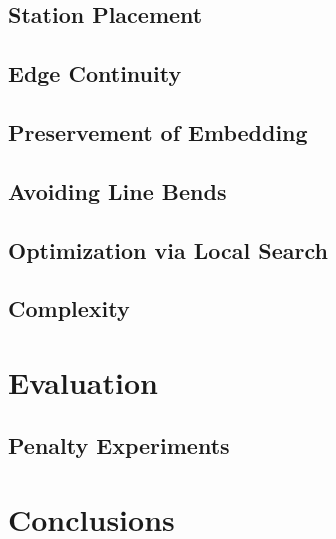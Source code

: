 \documentclass{sig-alternate-sigmod09}
\begin{document}
\subsection{Station Placement}

\subsection{Edge Continuity}

\subsection{Preservement of Embedding}

\subsection{Avoiding Line Bends}

\subsection{Optimization via Local Search}

\subsection{Complexity}

\section{Evaluation}

\subsection{Penalty Experiments}

\section{Conclusions}


\balancecolumns
\end{document}
